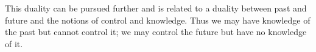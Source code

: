 \begin{savequote}[0.55\linewidth]
	\begin{fancyquote}
		This duality can be pursued further and is related to a duality
		between past and future and the notions of control and
		knowledge. Thus we may have knowledge of the past but cannot
		control it; we may control the future but have no knowledge of
		it.
	\end{fancyquote}
\end{savequote}
